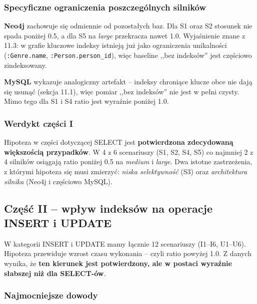 \subsubsection*{Specyficzne ograniczenia poszczególnych silników}

\textbf{Neo4j} zachowuje się odmiennie od pozostałych baz. Dla S1
oraz S2 stosunek nie spada poniżej 0.5, a dla S5 na \emph{large}
przekracza nawet 1.0. Wyjaśnienie znane z 11.3: w grafie kluczowe
indeksy istnieją już jako ograniczenia unikalności (\texttt{:Genre.name},
\texttt{:Person.person\_id}), więc baseline ,,bez indeksów'' jest
częściowo zindeksowany.

\textbf{MySQL} wykazuje analogiczny artefakt -- indeksy chroniące
klucze obce nie dają się usunąć (sekcja 11.1), więc pomiar
,,bez indeksów'' nie jest w pełni czysty. Mimo tego dla S1 i S4
ratio jest wyraźnie poniżej 1.0.

\subsubsection*{Werdykt części I}

Hipoteza w części dotyczącej SELECT jest \textbf{potwierdzona
zdecydowaną większością przypadków}. W 4 z 6 scenariuszy (S1, S2,
S4, S5) co najmniej 2 z 4 silników osiągają ratio poniżej 0.5 na
\emph{medium} i \emph{large}. Dwa istotne zastrzeżenia, z którymi
hipoteza się musi zmierzyć: \emph{niska selektywność} (S3) oraz
\emph{architektura silnika} (Neo4j i częściowo MySQL).

\subsection{Część II -- wpływ indeksów na operacje INSERT i UPDATE}

W kategorii INSERT i UPDATE mamy łącznie 12 scenariuszy
(I1--I6, U1--U6). Hipoteza przewiduje wzrost czasu wykonania -- czyli
ratio powyżej 1.0. Z danych wynika, że \textbf{ten kierunek jest
potwierdzony, ale w postaci wyraźnie słabszej niż dla SELECT-ów}.

\subsubsection*{Najmocniejsze dowody}

